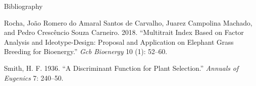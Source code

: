 \documentclass[
  ignorenonframetext,
  aspectratio=169,
]{beamer}
\newlength{\cslhangindent}
\newenvironment{CSLReferences}[2] %
 {\begin{list}{}{%
  \setlength{\itemindent}{0pt}
  \setlength{\leftmargin}{0pt}
  \setlength{\parsep}{0pt}
  \ifodd #1
   \setlength{\leftmargin}{\cslhangindent}
   \setlength{\itemindent}{-1\cslhangindent}
  \fi
  \setlength{\itemsep}{#2\baselineskip}}}
 {\end{list}}
\begin{document}
\begin{frame}{Bibliography}
\begin{CSLReferences}{1}{0}
Rocha, João Romero do Amaral Santos de Carvalho, Juarez Campolina
Machado, and Pedro Crescêncio Souza Carneiro. 2018. {``Multitrait Index
Based on Factor Analysis and Ideotype-Design: Proposal and Application
on Elephant Grass Breeding for Bioenergy.''} \emph{Gcb Bioenergy} 10
(1): 52--60.

Smith, H. F. 1936. {``A Discriminant Function for Plant Selection.''}
\emph{Annuals of Eugenics} 7: 240--50.

\end{CSLReferences}
\end{frame}
\end{document}
